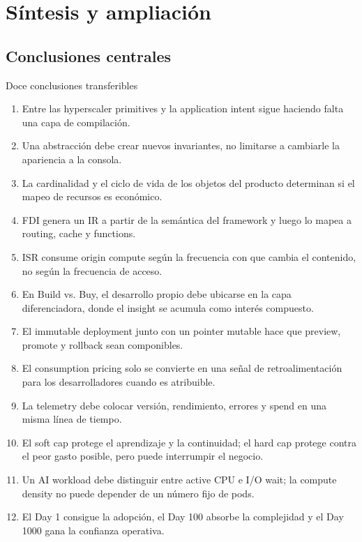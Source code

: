 \section{Síntesis y ampliación}

\subsection{Conclusiones centrales}

\begin{importantbox}{Doce conclusiones transferibles}
\begin{enumerate}
  \item Entre las hyperscaler primitives y la application intent sigue haciendo falta una capa de compilación.
  \item Una abstracción debe crear nuevos invariantes, no limitarse a cambiarle la apariencia a la consola.
  \item La cardinalidad y el ciclo de vida de los objetos del producto determinan si el mapeo de recursos es económico.
  \item FDI genera un IR a partir de la semántica del framework y luego lo mapea a routing, cache y functions.
  \item ISR consume origin compute según la frecuencia con que cambia el contenido, no según la frecuencia de acceso.
  \item En Build vs. Buy, el desarrollo propio debe ubicarse en la capa diferenciadora, donde el insight se acumula como interés compuesto.
  \item El immutable deployment junto con un pointer mutable hace que preview, promote y rollback sean componibles.
  \item El consumption pricing solo se convierte en una señal de retroalimentación para los desarrolladores cuando es atribuible.
  \item La telemetry debe colocar versión, rendimiento, errores y spend en una misma línea de tiempo.
  \item El soft cap protege el aprendizaje y la continuidad; el hard cap protege contra el peor gasto posible, pero puede interrumpir el negocio.
  \item Un AI workload debe distinguir entre active CPU e I/O wait; la compute density no puede depender de un número fijo de pods.
  \item El Day 1 consigue la adopción, el Day 100 absorbe la complejidad y el Day 1000 gana la confianza operativa.
\end{enumerate}
\end{importantbox}

